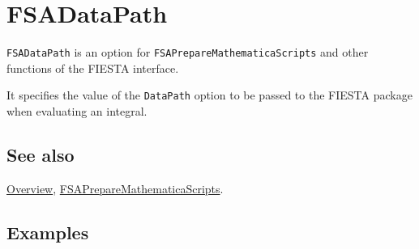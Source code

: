\documentclass[../FeynHelpersManual.tex]{subfiles}
\begin{document}
\begin{Shaded}
\begin{Highlighting}[]
 
\end{Highlighting}
\end{Shaded}

\hypertarget{fsadatapath}{
\section{FSADataPath}\label{fsadatapath}}

\texttt{FSADataPath} is an option for
\texttt{FSAPrepareMathematicaScripts} and other functions of the FIESTA
interface.

It specifies the value of the \texttt{DataPath} option to be passed to
the FIESTA package when evaluating an integral.

\subsection{See also}

\hyperlink{toc}{Overview},
\hyperlink{fsapreparemathematicascripts}{FSAPrepareMathematicaScripts}.

\subsection{Examples}
\end{document}
